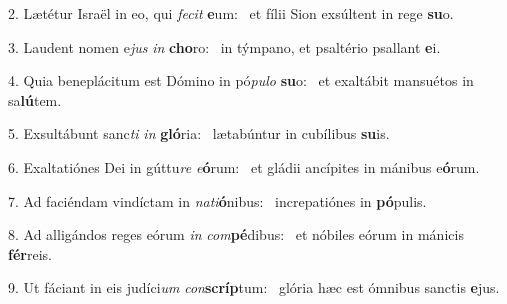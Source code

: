 2. Lætétur Israël in eo, qui \textit{fe}\textit{cit} \textbf{e}um: \ast\  et fílii Sion exsúltent in rege \textbf{su}o.\

3. Laudent nomen e\textit{jus} \textit{in} \textbf{cho}ro: \ast\  in týmpano, et psaltério psallant \textbf{e}i.\

4. Quia beneplácitum est Dómino in pó\textit{pu}\textit{lo} \textbf{su}o: \ast\  et exaltábit mansuétos in sa\textbf{lú}tem.\

5. Exsultábunt sanc\textit{ti} \textit{in} \textbf{gló}ria: \ast\  lætabúntur in cubílibus \textbf{su}is.\

6. Exaltatiónes Dei in gúttu\textit{re} \textit{e}\textbf{ó}rum: \ast\  et gládii ancípites in mánibus e\textbf{ó}rum.\

7. Ad faciéndam vindíctam in \textit{na}\textit{ti}\textbf{ó}nibus: \ast\  increpatiónes in \textbf{pó}pulis.\

8. Ad alligándos reges eórum \textit{in} \textit{com}\textbf{pé}dibus: \ast\  et nóbiles eórum in mánicis \textbf{fér}reis.\

9. Ut fáciant in eis judíci\textit{um} \textit{con}\textbf{scríp}tum: \ast\  glória hæc est ómnibus sanctis \textbf{e}jus.\

